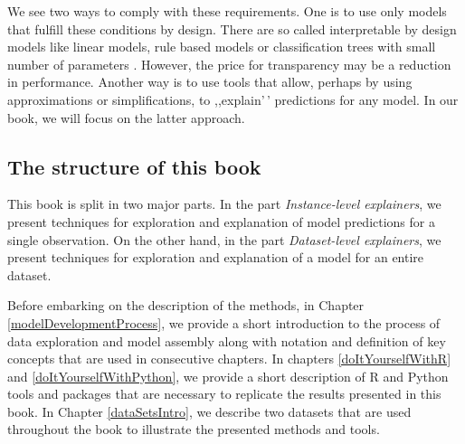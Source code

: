 \documentclass[12pt,]{krantz}
\begin{document}
We see two ways to comply with these requirements. One is to use only models that fulfill these conditions by design. There are so called interpretable by design models like linear models, rule based models or classification trees with small number of parameters \citep{molnar2019}. However, the price for transparency may be a reduction in performance. Another way is to use tools that allow, perhaps by using approximations or simplifications, to ,,explain'\,' predictions for any model. In our book, we will focus on the latter approach.

\hypertarget{bookstructure}{%
\subsection{The structure of this book}\label{bookstructure}}

This book is split in two major parts. In the part \emph{Instance-level explainers}, we present techniques for exploration and explanation of model predictions for a single observation. On the other hand, in the part \emph{Dataset-level explainers}, we present techniques for exploration and explanation of a model for an entire dataset.

Before embarking on the description of the methods, in Chapter
\ref{modelDevelopmentProcess}, we provide a short introduction to the process of data exploration and model assembly along with notation and definition of key concepts that are used in consecutive chapters.
In chapters \ref{doItYourselfWithR} and \ref{doItYourselfWithPython}, we provide a short description of R and Python tools and packages that are necessary to replicate the results presented in this book. In Chapter \ref{dataSetsIntro}, we describe two datasets that are used throughout the book to illustrate the presented methods and tools.
\end{document}

